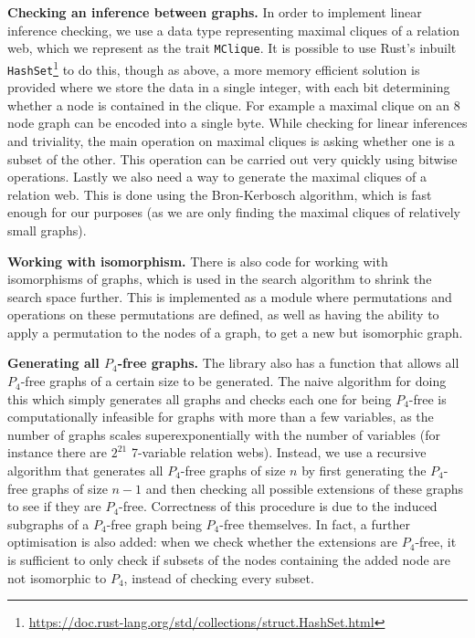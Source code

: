 \documentclass[a4paper, UKenglish, cleveref]{lipics-v2019}
\begin{document}
\textbf{Checking an inference between graphs.}
In order to implement linear inference checking, we use a data type representing maximal cliques of a relation web, which we represent as the trait \texttt{MClique}. It is possible to use Rust's inbuilt \texttt{HashSet}\footnote{\url{https://doc.rust-lang.org/std/collections/struct.HashSet.html}} to do this, though as above, a more memory efficient solution is provided where we store the data in a single integer, with each bit determining whether a node is contained in the clique. For example a maximal clique on an 8 node graph can be encoded into a single byte. While checking for linear inferences and triviality, the main operation on maximal cliques is asking whether one is a subset of the other. This operation can be carried out very quickly using bitwise operations. Lastly we also need a way to generate the maximal cliques of a relation web. This is done using the Bron-Kerbosch algorithm\cite{BroKer73:finding-all-maxcliques}, which is fast enough for our purposes (as we are only finding the maximal cliques of relatively small graphs).

\textbf{Working with isomorphism.}
There is also code for working with isomorphisms of graphs, which is used in the search algorithm to shrink the search space further. This is implemented as a module where permutations and operations on these permutations are defined, as well as having the ability to apply a permutation to the nodes of a graph, to get a new but isomorphic graph.

\textbf{Generating all $P_4$-free graphs.}
The library also has a function that allows all \(P_4\)-free graphs of a certain size to be generated. The naive algorithm for doing this which simply generates all graphs and checks each one for being \(P_4\)-free is computationally infeasible for graphs with more than a few variables, as the number of graphs scales superexponentially with the number of variables (for instance there are \(2^{21}\) 7-variable relation webs).
Instead, we use a recursive algorithm that generates all \(P_4\)-free graphs of size \(n\) by first generating the \(P_4\)-free graphs of size \(n-1\) and then checking all possible extensions of these graphs to see if they are \(P_4\)-free. Correctness of this procedure is due to the induced subgraphs of a \(P_4\)-free graph being \(P_4\)-free themselves. In fact, a further optimisation is also added: when we check whether the extensions are \(P_4\)-free, it is sufficient to only check if subsets of the nodes containing the added node are not isomorphic to \(P_4\), instead of checking every subset.
\end{document}
